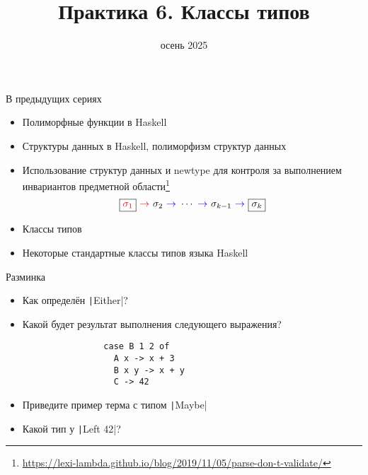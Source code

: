 
\newif\ifhandout




\title[6. Классы типов]{Практика 6. Классы типов}
\date{осень 2025}



    \setcounter{framenumber}{-1}
    \mymaketitle

    \begin{frame}[fragile]{В предыдущих сериях}
        \begin{itemize}
            \item Полиморфные функции в Haskell
            \item Структуры данных в Haskell, полиморфизм структур данных
            \item[\NB] Использование структур данных и newtype для контроля за выполнением инвариантов предметной области\footnote{\color{blue} \url{https://lexi-lambda.github.io/blog/2019/11/05/parse-don-t-validate/}}
            \begin{equation*}
                \framebox{\color{red}$\sigma_1$} {~\color{red} \rightarrow~} \sigma_2 {~\color{blue} \to~} \cdots {~\color{blue} \to~} \sigma_{k - 1} {~\color{blue} \to~} \framebox{$\sigma_k$}
            \end{equation*}
            \item[\newtopic] Классы типов
            \item[\newtopic] Некоторые стандартные классы типов языка Haskell
        \end{itemize}
    \end{frame}

    \begin{frame}[fragile]{Разминка}
        \begin{itemize}
            \item[\todo] Как определён \texttt|Either|?
            \item[\todo] Какой будет результат выполнения следующего выражения?
            \begin{verbatim}
                case B 1 2 of
                  A x -> x + 3
                  B x y -> x + y
                  C -> 42
            \end{verbatim}
            \item[\todo] Приведите пример терма с типом \texttt|Maybe|
            \item[\todo] Какой тип у \texttt|Left 42|?
        \end{itemize}
    \end{frame}

